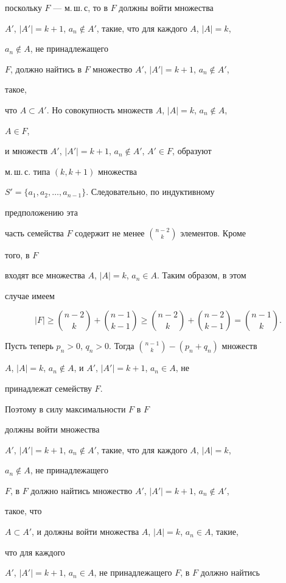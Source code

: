 поскольку $F$ --- м.\,ш.\,с, то в $F$ должны войти множества 


$A'$, $|A'|=k+1$, $a_n\notin A'$, такие, что для каждого $A$, $|A|=k$, 


$a_n\notin A$, не принадлежащего 


$F$, должно найтись в $F$ множество $A'$, $|A'|=k+1$, $a_n\notin A'$, 


такое, 


что $A\subset A'$. Но совокупность множеств $A$, $|A|=k$, $a_n\notin A$, 


$A\in F$, 


и множеств $A'$, $|A'|=k+1$, $a_n\notin A'$, $A'\in F$, образуют 


м.\,ш.\,с. типа $(k,k+1)$ множества 


$S'=\{a_1,a_2,\dotsc,a_{n-1}\}$. Следовательно, по индуктивному 


предположению эта 


часть семейства $F$ содержит не менее $\binom{n-2}{k}$ элементов. Кроме 


того, в $F$ 


входят все множества $A$, $|A|=k$, $a_n\in A$. Таким образом, в этом 


случае имеем 


$$ 


|F|\ge\binom{n-2}{k}+\binom{n-1}{k-1}\ge 


\binom{n-2}{k}+\binom{n-2}{k-1}=\binom{n-1}{k}. 


$$ 


Пусть теперь $p_n>0$, $q_n>0$. Тогда $\binom{n-1}{k}-(p_n+q_n)$ множеств 


$A$, $|A|=k$, $a_n\notin A$, и $A'$, $|A'|=k+1$, $a_n\in A$, не 


принадлежат семейству $F$. 


Поэтому в силу максимальности $F$ в $F$ 


должны войти множества 


$A'$, $|A'|=k+1$, $a_n\notin A'$, такие, что для каждого $A$, $|A|=k$, 


$a_n\notin A$, не принадлежащего 


$F$, в $F$ должно найтись множество $A'$, $|A'|=k+1$, $a_n\notin A'$, 


такое, что 


$A\subset A'$, и должны войти множества $A$, $|A|=k$, $a_n\in A$, такие, 


что для каждого 


$A'$, $|A'|=k+1$, $a_n\in A$, не принадлежащего $F$, в $F$ должно найтись 


